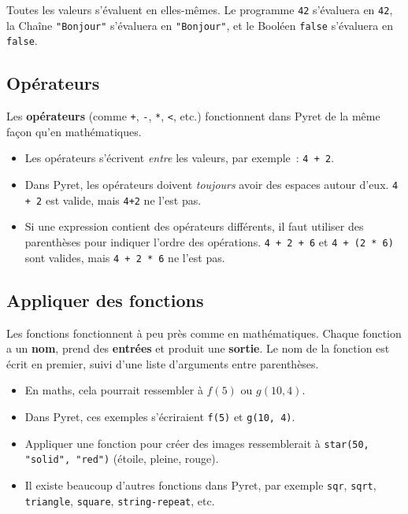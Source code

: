 \documentclass[12pt,a4paper]{article}
\newcommand{\pyret}[1]{\texttt{#1}}
\begin{document}
\begin{keypointbox}
  Toutes les valeurs s'évaluent en elles-mêmes. Le programme \pyret{42} s'évaluera en \pyret{42}, la Chaîne \pyret{"Bonjour"} s'évaluera en \pyret{"Bonjour"}, et le Booléen \pyret{false} s'évaluera en \pyret{false}.
\end{keypointbox}

\subsection*{Opérateurs}

Les \textbf{opérateurs} (comme \pyret{+}, \pyret{-}, \pyret{*}, \pyret{<}, etc.) fonctionnent dans Pyret de la même façon qu'en mathématiques.

\begin{itemize}
  \item Les opérateurs s'écrivent \emph{entre} les valeurs, par exemple~: \pyret{4 + 2}.
  \item Dans Pyret, les opérateurs doivent \emph{toujours} avoir des espaces autour d'eux. \pyret{4 + 2} est valide, mais \pyret{4+2} ne l'est pas.
  \item Si une expression contient des opérateurs différents, il faut utiliser des parenthèses pour indiquer l'ordre des opérations. \pyret{4 + 2 + 6} et \pyret{4 + (2 * 6)} sont valides, mais \pyret{4 + 2 * 6} ne l'est pas.
\end{itemize}

\subsection*{Appliquer des fonctions}

Les fonctions fonctionnent à peu près comme en mathématiques. Chaque fonction a un \textbf{nom}, prend des \textbf{entrées} et produit une \textbf{sortie}. Le nom de la fonction est écrit en premier, suivi d'une liste d'arguments entre parenthèses.

\begin{itemize}
  \item En maths, cela pourrait ressembler à $f(5)$ ou $g(10, 4)$.
  \item Dans Pyret, ces exemples s'écriraient \pyret{f(5)} et \pyret{g(10, 4)}.
  \item Appliquer une fonction pour créer des images ressemblerait à \pyret{star(50, "solid", "red")} (étoile, pleine, rouge).
  \item Il existe beaucoup d'autres fonctions dans Pyret, par exemple \pyret{sqr}, \pyret{sqrt}, \pyret{triangle}, \pyret{square}, \pyret{string-repeat}, etc.
\end{itemize}
\end{document}
